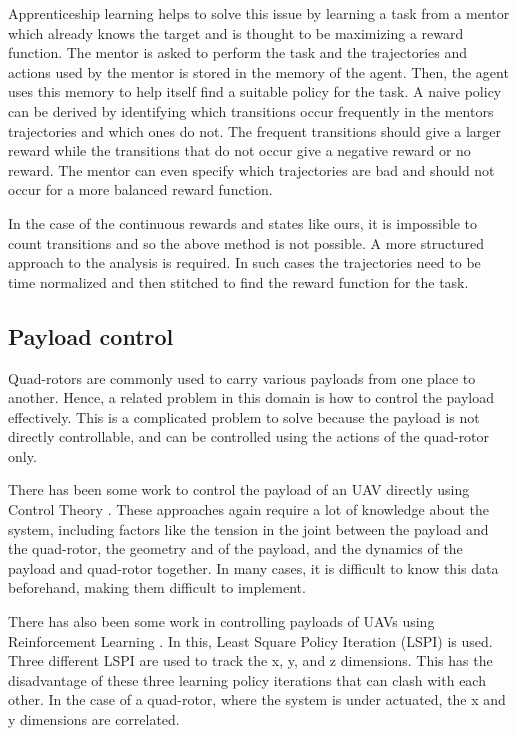 \documentclass[hidelinks,BTech]{iitmdiss}
\begin{document}
Apprenticeship learning \cite{ApprenticeshipLearning} helps to solve this issue by learning a task from a mentor which already knows the target and is thought to be maximizing a reward function. The mentor is asked to perform the task and the trajectories and actions used by the mentor is stored in the memory of the agent. Then, the agent uses this memory to help itself find a suitable policy for the task. A naive policy can be derived by identifying which transitions occur frequently in the mentors trajectories and which ones do not. The frequent transitions should give a larger reward while the transitions that do not occur give a negative reward or no reward. The mentor can even specify which trajectories are bad and should not occur for a more balanced reward function.

In the case of the continuous rewards and states like ours, it is impossible to count transitions and so the above method is not possible. A more structured approach to the analysis is required. In such cases the trajectories need to be time normalized and then stitched to find the reward function for the task.

\subsection{Payload control}

Quad-rotors are commonly used to carry various payloads from one place to another. Hence, a related problem in this domain is how to control the payload effectively. This is a complicated problem to solve because the payload is not directly controllable, and can be controlled using the actions of the quad-rotor only.

There has been some work to control the payload of an UAV directly using Control Theory \cite{PayloadControlTheory,PayloadControlTheory2}. These approaches again require a lot of knowledge about the system, including factors like the tension in the joint between the payload and the quad-rotor, the geometry and of the payload, and the dynamics of the payload and quad-rotor together. In many cases, it is difficult to know this data beforehand, making them difficult to implement.

There has also been some work in controlling payloads of UAVs using Reinforcement Learning \cite{PayloadLSPI}. In this, Least Square Policy Iteration (LSPI) is used. Three different LSPI are used to track the x, y, and z dimensions. This has the disadvantage of these three learning policy iterations that can clash with each other. In the case of a quad-rotor, where the system is under actuated, the x and y dimensions are correlated.
\end{document}
